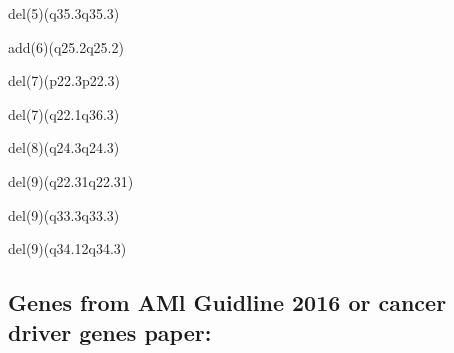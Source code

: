 \documentclass[]{article}
\begin{document}
del(5)(q35.3q35.3)

add(6)(q25.2q25.2)

del(7)(p22.3p22.3)

del(7)(q22.1q36.3)

del(8)(q24.3q24.3)

del(9)(q22.31q22.31)

del(9)(q33.3q33.3)

del(9)(q34.12q34.3)

\hypertarget{genes-from-aml-guidline-2016-or-cancer-driver-genes-paper}{%
\subsection{Genes from AMl Guidline 2016 or cancer driver genes
paper:}\label{genes-from-aml-guidline-2016-or-cancer-driver-genes-paper}}
\end{document}
